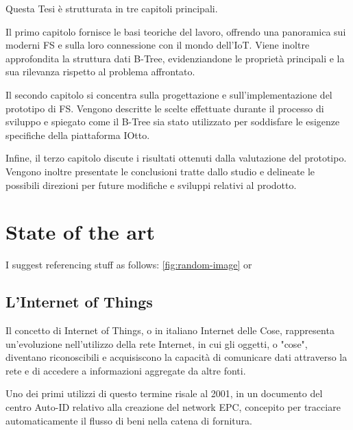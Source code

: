 \documentclass[12pt,a4paper,openright,twoside]{book}
\begin{document}
        Questa Tesi è strutturata in tre capitoli principali.

        Il primo capitolo fornisce le basi teoriche del lavoro, offrendo una panoramica sui moderni \ac{FS} e sulla loro connessione con il mondo dell’\ac{IoT}.
        Viene inoltre approfondita la struttura dati B-Tree, evidenziandone le proprietà principali e la sua rilevanza rispetto al problema affrontato.

        Il secondo capitolo si concentra sulla progettazione e sull’implementazione del prototipo di \ac{FS}.
        Vengono descritte le scelte effettuate durante il processo di sviluppo e spiegato come il B-Tree sia stato utilizzato per soddisfare le esigenze specifiche della piattaforma IOtto.

        Infine, il terzo capitolo discute i risultati ottenuti dalla valutazione del prototipo. Vengono inoltre presentate le conclusioni tratte dallo studio e delineate le possibili direzioni per future modifiche e sviluppi relativi al prodotto.

\chapter{State of the art}

I suggest referencing stuff as follows: \cref{fig:random-image} or 


    \section{L'Internet of Things}

        Il concetto di Internet of Things, o in italiano Internet delle Cose, rappresenta un'evoluzione nell'utilizzo della rete Internet, in cui gli oggetti, o "cose", diventano riconoscibili e acquisiscono la capacità di comunicare dati attraverso la rete e di accedere a informazioni aggregate da altre fonti.

        Uno dei primi utilizzi di questo termine risale al 2001, in un documento del centro Auto-ID relativo alla creazione del network EPC, concepito per tracciare automaticamente il flusso di beni nella catena di fornitura.
\end{document}
